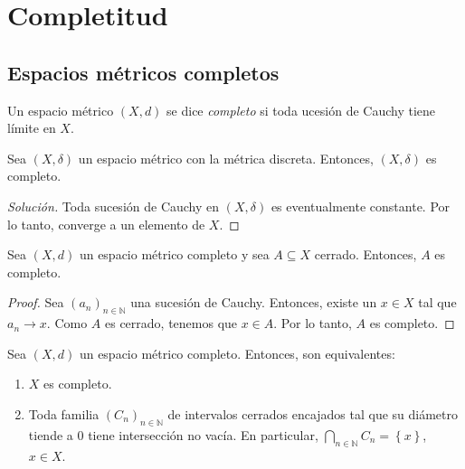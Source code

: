 \chapter{Completitud}

\section{Espacios métricos completos}

\begin{definition}
	Un espacio métrico $(X, d)$ se dice \emph{completo} si toda ucesión de Cauchy tiene límite en $X$.
\end{definition}

\begin{example}
	Sea $(X, \delta)$ un espacio métrico con la métrica discreta. Entonces, $(X, \delta)$ es completo.
\end{example}

\begin{proof}[Solución]
	Toda sucesión de Cauchy en $(X, \delta)$ es eventualmente constante. Por lo tanto, converge a un elemento de $X$.
\end{proof}

\begin{proposition}
	Sea $(X, d)$ un espacio métrico completo y sea $A \subseteq X$ cerrado. Entonces, $A$ es completo.
\end{proposition}

\begin{proof}
	Sea $(a_n)_{n \in \mathbb{N}}$ una sucesión de Cauchy. Entonces, existe un $x \in X$ tal que $a_n \longrightarrow x$. Como $A$ es cerrado, tenemos que $x \in A$. Por lo tanto, $A$ es completo.
\end{proof}

\begin{theorem}
	Sea $(X, d)$ un espacio métrico completo. Entonces, son equivalentes:
	\begin{enumerate}
		\item $X$ es completo.
		\item Toda familia $(C_n)_{n \in \mathbb{N}}$ de intervalos cerrados encajados tal que su diámetro tiende a $0$ tiene intersección no vacía. En particular, $\bigcap_{n \in \mathbb{N}} C_n = \left\{ x \right\}$, $x \in X$.
	\end{enumerate}
\end{theorem}

